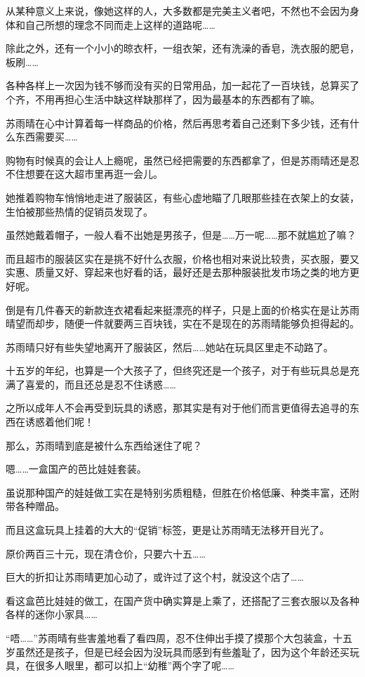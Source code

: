 从某种意义上来说，像她这样的人，大多数都是完美主义者吧，不然也不会因为身体和自己所想的理念不同而走上这样的道路呢……

除此之外，还有一个小小的晾衣杆，一组衣架，还有洗澡的香皂，洗衣服的肥皂，板刷……

各种各样上一次因为钱不够而没有买的日常用品，加一起花了一百块钱，总算买了个齐，不用再担心生活中缺这样缺那样了，因为最基本的东西都有了嘛。

苏雨晴在心中计算着每一样商品的价格，然后再思考着自己还剩下多少钱，还有什么东西需要买……

购物有时候真的会让人上瘾呢，虽然已经把需要的东西都拿了，但是苏雨晴还是忍不住想要在这大超市里再逛一会儿。

她推着购物车悄悄地走进了服装区，有些心虚地瞄了几眼那些挂在衣架上的女装，生怕被那些热情的促销员发现了。

虽然她戴着帽子，一般人看不出她是男孩子，但是……万一呢……那不就尴尬了嘛？

而且超市的服装区实在是挑不好什么衣服，价格也相对来说比较贵，买衣服，要又实惠、质量又好、穿起来也好看的话，最好还是去那种服装批发市场之类的地方更好呢。

倒是有几件春天的新款连衣裙看起来挺漂亮的样子，只是上面的价格实在是让苏雨晴望而却步，随便一件就要两三百块钱，实在不是现在的苏雨晴能够负担得起的。

苏雨晴只好有些失望地离开了服装区，然后……她站在玩具区里走不动路了。

十五岁的年纪，也算是一个大孩子了，但终究还是一个孩子，对于有些玩具总是充满了喜爱的，而且还总是忍不住诱惑……

之所以成年人不会再受到玩具的诱惑，那其实是有对于他们而言更值得去追寻的东西在诱惑着他们呢！

那么，苏雨晴到底是被什么东西给迷住了呢？

嗯……一盒国产的芭比娃娃套装。

虽说那种国产的娃娃做工实在是特别劣质粗糙，但胜在价格低廉、种类丰富，还附带各种赠品。

而且这盒玩具上挂着的大大的“促销”标签，更是让苏雨晴无法移开目光了。

原价两百三十元，现在清仓价，只要六十五……

巨大的折扣让苏雨晴更加心动了，或许过了这个村，就没这个店了……

看这盒芭比娃娃的做工，在国产货中确实算是上乘了，还搭配了三套衣服以及各种各样的迷你小家具……

“唔……”苏雨晴有些害羞地看了看四周，忍不住伸出手摸了摸那个大包装盒，十五岁虽然还是孩子，但是已经会因为没玩具而感到有些羞耻了，因为这个年龄还买玩具，在很多人眼里，都可以扣上“幼稚”两个字了呢……

